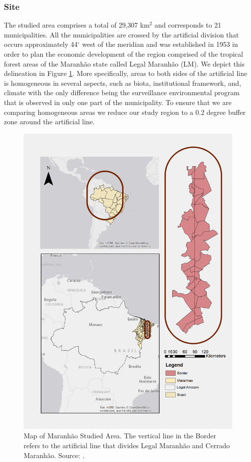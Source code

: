 \subsubsection{Site}
The studied area comprises a total of 29,307 km$^{2}$ and corresponds to 21 municipalities. All the municipalities are crossed by the artificial division that occurs approximately 44$^{\circ}$ west of the meridian and was established in 1953 in order to plan the economic development of the region comprised of the tropical forest areas of the Maranhão state called Legal Maranhão (LM). We depict this delineation in Figure \ref{fig:delimitacao}.  More specifically,  areas to both sides of the artificial line is homogeneous in several aspects, such as biota, institutional framework, and, climate with the only difference being the surveillance environmental program that is observed in only one part of the municipality. To ensure that we are comparing homogeneous areas we reduce our study region to a 0.2 degree buffer zone around the artificial line.   

\begin{figure}[H]
  \centering
  \includegraphics[width=1\textwidth, inner]{Chapter3/MaranhaoChapter3_Fig1.png}
\caption[Map of Maranhão Studied Area]{Map of Maranhão Studied Area. The vertical line in the Border refers to the artificial line that divides Legal Maranhão and Cerrado Maranhão. Source: \citep{MMMAwebsite,nugeo_2018}.}
\label{fig:delimitacao}
\end{figure}

